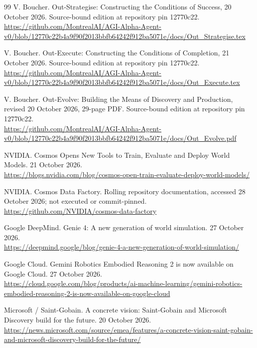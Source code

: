 \begin{thebibliography}{99}
 V. Boucher. Out-Strategise: Constructing the Conditions of Success, 20 October 2026. Source-bound edition at repository pin 12770c22.\\\url{https://github.com/MontrealAI/AGI-Alpha-Agent-v0/blob/12770c22b4a9f90f2013bbfb64242f912ba5071e/docs/Out_Strategise.tex}

 V. Boucher. Out-Execute: Constructing the Conditions of Completion, 21 October 2026. Source-bound edition at repository pin 12770c22.\\\url{https://github.com/MontrealAI/AGI-Alpha-Agent-v0/blob/12770c22b4a9f90f2013bbfb64242f912ba5071e/docs/Out_Execute.tex}

 V. Boucher. Out-Evolve: Building the Means of Discovery and Production, revised 20 October 2026, 29-page PDF. Source-bound edition at repository pin 12770c22.\\\url{https://github.com/MontrealAI/AGI-Alpha-Agent-v0/blob/12770c22b4a9f90f2013bbfb64242f912ba5071e/docs/Out_Evolve.pdf}

 NVIDIA. Cosmos Opens New Tools to Train, Evaluate and Deploy World Models. 21 October 2026.\\\url{https://blogs.nvidia.com/blog/cosmos-open-train-evaluate-deploy-world-models/}

 NVIDIA. Cosmos Data Factory. Rolling repository documentation, accessed 28 October 2026; not executed or commit-pinned.\\\url{https://github.com/NVIDIA/cosmos-data-factory}

 Google DeepMind. Genie 4: A new generation of world simulation. 27 October 2026.\\\url{https://deepmind.google/blog/genie-4-a-new-generation-of-world-simulation/}

 Google Cloud. Gemini Robotics Embodied Reasoning 2 is now available on Google Cloud. 27 October 2026.\\\url{https://cloud.google.com/blog/products/ai-machine-learning/gemini-robotics-embodied-reasoning-2-is-now-available-on-google-cloud}

 Microsoft / Saint-Gobain. A concrete vision: Saint-Gobain and Microsoft Discovery build for the future. 20 October 2026.\\\url{https://news.microsoft.com/source/emea/features/a-concrete-vision-saint-gobain-and-microsoft-discovery-build-for-the-future/}


\end{thebibliography}
